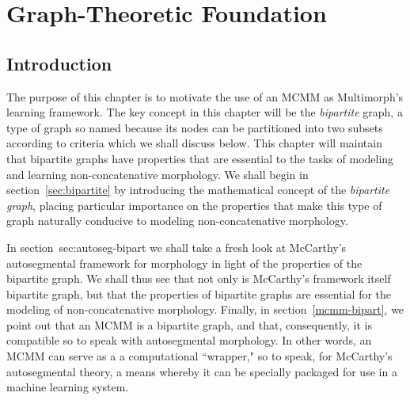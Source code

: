 \chapter{Graph-Theoretic Foundation}
\label{ch:graph}
\section{Introduction}
The purpose of this chapter is to motivate the use of an \ac{MCMM} as Multimorph's learning framework. The key concept in this chapter will be the \emph{bipartite} graph, a type of graph so named because its nodes can be partitioned into two subsets according to criteria which we shall discuss below. This chapter will maintain that bipartite graphs have properties that are essential to the tasks of modeling and learning non-concatenative morphology.
We shall begin in section~\ref{sec:bipartite} by introducing the mathematical concept of the \emph{bipartite graph}, placing particular importance on the properties that make this type of graph naturally conducive to modeling non-concatenative morphology. %

In section~{sec:autoseg-bipart} we shall take a fresh look at McCarthy's autosegmental framework for morphology \citep{mccarthy:1981} in light of the properties of the bipartite graph. We shall thus see that not only is McCarthy's framework itself bipartite graph, but that the properties of bipartite graphs are essential for the modeling of non-concatenative morphology.
Finally, in section~\ref{mcmm-bipart}, we point out that an \ac{MCMM} is a bipartite graph, and that, consequently, it is compatible so to  speak with autosegmental morphology. In other words, an MCMM can serve as a
a computational ``wrapper," so to speak, for McCarthy's autosegmental theory, a means whereby it can be specially packaged for use in a machine learning system. 
 
